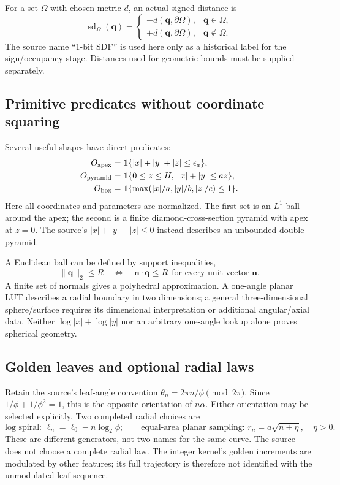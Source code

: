 \documentclass[11pt,a4paper]{article}
\newcommand{\ind}{\mathbf{1}}
\numberwithin{equation}{section}
\begin{document}
For a set $\Omega$ with chosen metric $d$, an actual signed distance is
\begin{equation}
\operatorname{sd}_{\Omega}(\bm q)=
\begin{cases}-d(\bm q,\partial\Omega),&\bm q\in\Omega,\\
+d(\bm q,\partial\Omega),&\bm q\notin\Omega.
\end{cases}
\end{equation}
The source name ``1-bit SDF'' is used here only as a historical label for the sign/occupancy stage. Distances used for geometric bounds must be supplied separately.

\subsection{Primitive predicates without coordinate squaring}
Several useful shapes have direct predicates:
\begin{align}
O_{\rm apex}&=\ind\{|x|+|y|+|z|\le\epsilon_a\},\\
O_{\rm pyramid}&=\ind\{0\le z\le H,\ |x|+|y|\le a z\},\\
O_{\rm box}&=\ind\{\max(|x|/a,|y|/b,|z|/c)\le1\}.
\end{align}
Here all coordinates and parameters are normalized. The first set is an $L^1$ ball around the apex; the second is a finite diamond-cross-section pyramid with apex at $z=0$. The source's $|x|+|y|-|z|\le0$ instead describes an unbounded double pyramid.

A Euclidean ball can be defined by support inequalities,
\begin{equation}
\|\bm q\|_2\le R\quad\Longleftrightarrow\quad
\bm n\cdot\bm q\le R\ \ \text{for every unit vector }\bm n.
\end{equation}
A finite set of normals gives a polyhedral approximation. A one-angle planar LUT describes a radial boundary in two dimensions; a general three-dimensional sphere/surface requires its dimensional interpretation or additional angular/axial data. Neither $\log|x|+\log|y|$ nor an arbitrary one-angle lookup alone proves spherical geometry.

\subsection{Golden leaves and optional radial laws}
Retain the source's leaf-angle convention
$\theta_n=2\pi n/\phi\pmod{2\pi}$. Since $1/\phi+1/\phi^2=1$, this is the opposite orientation of $n\alpha$. Either orientation may be selected explicitly. Two completed radial choices are
\begin{equation}
\text{log spiral: }\ell_n=\ell_0-n\log_2\phi;
\qquad
\text{equal-area planar sampling: }r_n=a\sqrt{n+\eta},\quad\eta>0.
\end{equation}
These are different generators, not two names for the same curve. The source does not choose a complete radial law. The integer kernel's golden increments are modulated by other features; its full trajectory is therefore not identified with the unmodulated leaf sequence.
\end{document}
